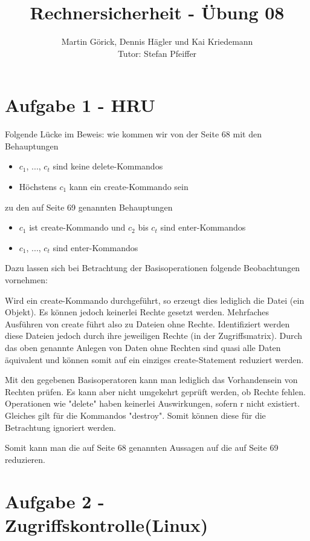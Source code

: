 \documentclass{scrartcl}
\title{Rechnersicherheit - Übung 08}
\author{Martin Görick, Dennis Hägler und Kai Kriedemann \\ Tutor: Stefan Pfeiffer}
\begin{document}
\maketitle


\section*{Aufgabe 1 - HRU}
Folgende Lücke im Beweis: wie kommen wir von der Seite 68 mit den Behauptungen
\begin{itemize}
  \item $c_{1}$, ..., $c_{t}$ sind keine delete-Kommandos
  \item Höchstens $c_{1}$ kann ein create-Kommando sein
\end{itemize}

zu den auf Seite 69 genannten Behauptungen
\begin{itemize}
  \item $c_{1}$ ist create-Kommando und $c_{2}$ bis $c_{t}$ sind enter-Kommandos
  \item $c_{1}$, ..., $c_{t}$ sind enter-Kommandos
\end{itemize}

Dazu lassen sich bei Betrachtung der Basisoperationen folgende Beobachtungen vornehmen:

Wird ein create-Kommando durchgeführt, so erzeugt dies lediglich die Datei (ein Objekt).
Es können jedoch keinerlei Rechte gesetzt werden. Mehrfaches Ausführen von create führt also
zu Dateien ohne Rechte. Identifiziert werden diese Dateien jedoch durch ihre jeweiligen Rechte
(in der Zugriffsmatrix). Durch das oben genannte Anlegen von Daten ohne Rechten sind quasi
alle Daten äquivalent und können somit auf ein einziges create-Statement reduziert werden.

Mit den gegebenen Basisoperatoren kann man lediglich das Vorhandensein von Rechten prüfen.
Es kann aber nicht umgekehrt geprüft werden, ob Rechte fehlen. Operationen wie "delete"
haben keinerlei Auswirkungen, sofern r nicht existiert. Gleiches gilt für die Kommandos
"destroy". Somit können diese für die Betrachtung ignoriert werden.

Somit kann man die auf Seite 68 genannten Aussagen auf die auf Seite 69 reduzieren.


\section*{Aufgabe 2 - Zugriffskontrolle(Linux)}
\end{document}

